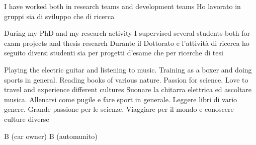 {  %
  \personalSkills

    
    \communicationSkills
      {I have worked both in research teams and development teams}
      {Ho lavorato in gruppi sia di sviluppo che di ricerca}
    
    \organisationalSkills
      {During my PhD and my research activity I supervised several students both for exam projects and thesis research}
      {Durante il Dottorato e l'attività di ricerca ho seguito diversi studenti sia per progetti d'esame che per ricerche di tesi}
      
    \computerSkills
      {}
      {}
      
    \otherSkills
      {Playing the electric guitar and listening to music. Training as a boxer and doing sports in general. Reading books of various nature. Passion for science. Love to travel and experience different cultures}
      {Suonare la chitarra elettrica ed ascoltare musica. Allenarsi come pugile e fare sport in generale. Leggere libri di vario genere. Grande passione per le scienze. Viaggiare per il mondo e conoscere culture diverse}
      
    \drivingLicence
      {B (car owner)}
      {B (automunito)}   


  \additionalInfo
  
}
